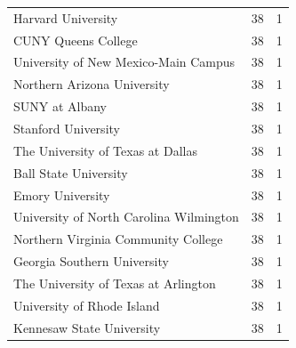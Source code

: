 \documentclass{mcmthesis}
\begin{document}
\begin{appendices}
\begin{tabular}{lcc}
        Harvard University	&38	&1\\
        CUNY Queens College	&38	&1\\
        University of New Mexico-Main Campus	&38	&1\\
        Northern Arizona University&	38	&1\\
        SUNY at Albany	&38&	1\\
        Stanford University	&38	&1\\
        The University of Texas at Dallas	&38	&1\\
        Ball State University	&38	&1\\
        Emory University	&38&	1\\
        University of North Carolina Wilmington	&38	&1\\
        Northern Virginia Community College&	38	&1\\
        Georgia Southern University	&38	&1\\
        The University of Texas at Arlington	&38	&1\\
        University of Rhode Island	&38	&1\\
        Kennesaw State University	&38	&1\\\hline
        
    \end{tabular}
    

\end{appendices}
\end{document}
